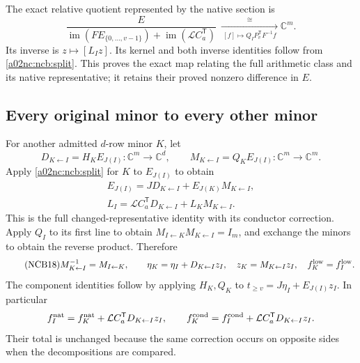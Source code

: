 The exact relative quotient represented by the native section is
\begin{equation}\tag{NCB15}\label{a02nc:ncb:relative}
\frac{E}
 {\operatorname{im}(FE_{\{0,\ldots,v-1\}})
          +\operatorname{im}(\mathcal LC_a^{\mathsf T})}
\ \xrightarrow[\ [f]\mapsto Q_IP_v^{\mathsf T}F^{-1}f\ ]{\ \cong\ }
\mathbb C^m .
\end{equation}
Its inverse is $z\mapsto[L_Iz]$. Its kernel and both inverse identities
follow from \eqref{a02nc:ncb:split}. This proves the exact map relating the
full arithmetic class and its native representative; it retains their
proved nonzero difference in $E$.

\subsection{Every original minor to every other minor}
For another admitted $d$-row minor $K$, let
\begin{equation}\tag{NCB16}\label{a02nc:ncb:transition}
D_{K\leftarrow I}=H_KE_{J(I)}:\mathbb C^m\to\mathbb C^d,\qquad
M_{K\leftarrow I}=Q_KE_{J(I)}:\mathbb C^m\to\mathbb C^m .
\end{equation}
Apply \eqref{a02nc:ncb:split} for $K$ to $E_{J(I)}$ to obtain
\begin{equation}\tag{NCB17}\label{a02nc:ncb:section-transition}
\begin{gathered}
E_{J(I)}=JD_{K\leftarrow I}
              +E_{J(K)}M_{K\leftarrow I},\\
L_I=\mathcal LC_a^{\mathsf T}D_{K\leftarrow I}
              +L_KM_{K\leftarrow I}.
\end{gathered}
\end{equation}
This is the full changed-representative identity with its conductor
correction. Apply $Q_I$ to its first line to obtain
$M_{I\leftarrow K}M_{K\leftarrow I}=I_m$, and exchange the minors
to obtain the reverse product. Therefore
\begin{equation}\tag{NCB18}\label{a02nc:ncb:inverse}
M_{K\leftarrow I}^{-1}=M_{I\leftarrow K},\qquad
\eta_K=\eta_I+D_{K\leftarrow I}z_I,\quad
z_K=M_{K\leftarrow I}z_I,\quad
f_K^{\rm low}=f_I^{\rm low}.
\end{equation}
The component identities follow by applying $H_K,Q_K$ to
$t_{\geq v}=J\eta_I+E_{J(I)}z_I$. In particular
\[
f_I^{\rm nat}=f_K^{\rm nat}
       +\mathcal LC_a^{\mathsf T}D_{K\leftarrow I}z_I,\qquad
f_K^{\rm cond}=f_I^{\rm cond}
       +\mathcal LC_a^{\mathsf T}D_{K\leftarrow I}z_I.
\]
Their total is unchanged because the same correction occurs on
opposite sides when the decompositions are compared.

